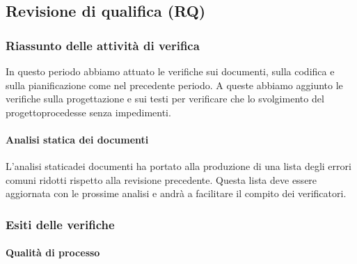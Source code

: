 \subsection{Revisione di qualifica (RQ)}
\subsubsection{Riassunto delle attività di verifica}
In questo periodo abbiamo attuato le verifiche sui documenti, sulla codifica e sulla pianificazione come nel precedente periodo. A queste abbiamo aggiunto le verifiche sulla progettazione e sui testi per verificare che lo svolgimento del progetto\glosp procedesse senza impedimenti.  
\paragraph{Analisi statica dei documenti}
L'analisi statica\glosp dei documenti ha portato alla produzione di una lista degli errori comuni ridotti rispetto alla revisione precedente. Questa lista deve essere aggiornata con le prossime analisi e andrà a facilitare il compito dei verificatori.
\subsubsection{Esiti delle verifiche} 
\paragraph{Qualità di processo}
